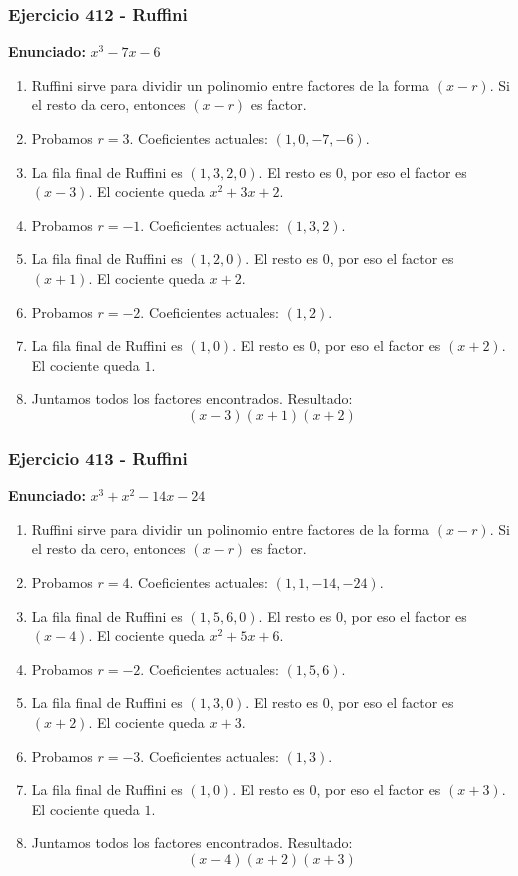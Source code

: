 \documentclass[11pt,a4paper]{article}
\begin{document}
\vspace{0.2cm}
\subsubsection*{Ejercicio 412 - Ruffini}
\textbf{Enunciado:} $ x^{3} - 7 x - 6 $\par
\begin{enumerate}[leftmargin=2em]
\item Ruffini sirve para dividir un polinomio entre factores de la forma \((x-r)\). Si el resto da cero, entonces \((x-r)\) es factor.
\item Probamos \(r=3\). Coeficientes actuales: \((1, 0, -7, -6)\).
\item La fila final de Ruffini es \((1, 3, 2, 0)\). El resto es \(0\), por eso el factor es \((x-3)\). El cociente queda \(x^{2} + 3 x + 2\).
\item Probamos \(r=-1\). Coeficientes actuales: \((1, 3, 2)\).
\item La fila final de Ruffini es \((1, 2, 0)\). El resto es \(0\), por eso el factor es \((x+1)\). El cociente queda \(x + 2\).
\item Probamos \(r=-2\). Coeficientes actuales: \((1, 2)\).
\item La fila final de Ruffini es \((1, 0)\). El resto es \(0\), por eso el factor es \((x+2)\). El cociente queda \(1\).
\item Juntamos todos los factores encontrados. Resultado: \[\boxed{\left(x - 3\right) \left(x + 1\right) \left(x + 2\right)}\]
\end{enumerate}

\vspace{0.2cm}
\subsubsection*{Ejercicio 413 - Ruffini}
\textbf{Enunciado:} $ x^{3} + x^{2} - 14 x - 24 $\par
\begin{enumerate}[leftmargin=2em]
\item Ruffini sirve para dividir un polinomio entre factores de la forma \((x-r)\). Si el resto da cero, entonces \((x-r)\) es factor.
\item Probamos \(r=4\). Coeficientes actuales: \((1, 1, -14, -24)\).
\item La fila final de Ruffini es \((1, 5, 6, 0)\). El resto es \(0\), por eso el factor es \((x-4)\). El cociente queda \(x^{2} + 5 x + 6\).
\item Probamos \(r=-2\). Coeficientes actuales: \((1, 5, 6)\).
\item La fila final de Ruffini es \((1, 3, 0)\). El resto es \(0\), por eso el factor es \((x+2)\). El cociente queda \(x + 3\).
\item Probamos \(r=-3\). Coeficientes actuales: \((1, 3)\).
\item La fila final de Ruffini es \((1, 0)\). El resto es \(0\), por eso el factor es \((x+3)\). El cociente queda \(1\).
\item Juntamos todos los factores encontrados. Resultado: \[\boxed{\left(x - 4\right) \left(x + 2\right) \left(x + 3\right)}\]
\end{enumerate}
\end{document}

